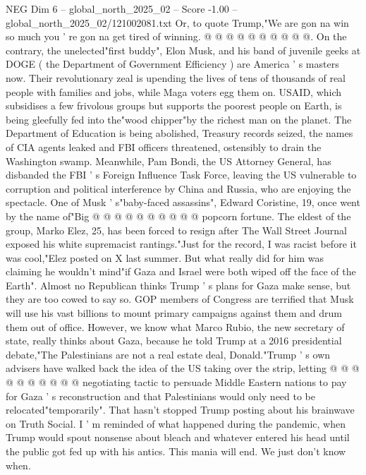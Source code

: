 \begin{textsample}{NEG Dim 6 – global\_north\_2025\_02 – Score -1.00 – global\_north\_2025\_02/121002081.txt}
Or, to quote Trump,"We are gon na win so much you ' re gon na get tired of winning. @ @ @ @ @ @ @ @ @ @.
On the contrary, the unelected"first buddy", Elon Musk, and his band of juvenile geeks at DOGE ( the Department of Government Efficiency ) are America ' s masters now.
Their revolutionary zeal is upending the lives of tens of thousands of real people with families and jobs, while Maga voters egg them on.
USAID, which subsidises a few frivolous groups but supports the poorest people on Earth, is being gleefully fed into the"wood chipper"by the richest man on the planet.
The Department of Education is being abolished, Treasury records seized, the names of CIA agents leaked and FBI officers threatened, ostensibly to drain the Washington swamp.
Meanwhile, Pam Bondi, the US Attorney General, has disbanded the FBI ' s Foreign Influence Task Force, leaving the US vulnerable to corruption and political interference by China and Russia, who are enjoying the spectacle.
One of Musk ' s"baby-faced assassins", Edward Coristine, 19, once went by the name of"Big @ @ @ @ @ @ @ @ @ @ popcorn fortune.
The eldest of the group, Marko Elez, 25, has been forced to resign after The Wall Street Journal exposed his white supremacist rantings."Just for the record, I was racist before it was cool,"Elez posted on X last summer.
But what really did for him was claiming he wouldn't mind"if Gaza and Israel were both wiped off the face of the Earth".
Almost no Republican thinks Trump ' s plans for Gaza make sense, but they are too cowed to say so.
GOP members of Congress are terrified that Musk will use his vast billions to mount primary campaigns against them and drum them out of office.
However, we know what Marco Rubio, the new secretary of state, really thinks about Gaza, because he told Trump at a 2016 presidential debate,"The Palestinians are not a real estate deal, Donald."Trump ' s own advisers have walked back the idea of the US taking over the strip, letting @ @ @ @ @ @ @ @ @ @ negotiating tactic to persuade Middle Eastern nations to pay for Gaza ' s reconstruction and that Palestinians would only need to be relocated"temporarily".
That hasn't stopped Trump posting about his brainwave on Truth Social.
I ' m reminded of what happened during the pandemic, when Trump would spout nonsense about bleach and whatever entered his head until the public got fed up with his antics.
This mania will end.
We just don't know when.

\end{textsample}
